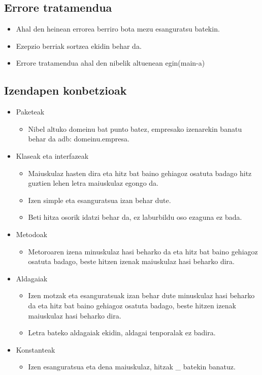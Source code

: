 \subsection{Errore tratamendua}
    \begin{itemize}
      \item Ahal den heinean errorea berriro bota mezu esanguratsu batekin.
      \item Ezepzio berriak sortzea ekidin behar da.
      \item Errore tratamendua ahal den nibelik altuenean egin(main-a)
    \end{itemize}
  
  
  

\subsection{Izendapen konbetzioak}
	\begin{itemize}
	  \item Paketeak
	    \begin{itemize}
	      \item Nibel altuko domeinu bat punto batez, empresako izenarekin banatu behar da adb: domeinu.empresa.       
	    \end{itemize}
	  \item  Klaseak eta interfazeak
	    \begin{itemize}
	      \item Maiuskulaz hasten dira eta hitz bat baino gehiagoz osatuta badago hitz guztien lehen letra maiuskulaz egongo da.
	      \item Izen simple eta esanguratsua izan behar dute.
	      \item Beti hitza osorik idatzi behar da, ez laburbildu oso ezaguna ez bada.
	    \end{itemize}
	  \item Metodoak
	    \begin{itemize}
	      \item Metoroaren izena minuskulaz hasi beharko da eta hitz bat baino gehiagoz osatuta badago, beste hitzen izenak maiuskulaz hasi beharko dira.
	    \end{itemize}
	  \item Aldagaiak
	    \begin{itemize}
	      \item Izen motzak eta esanguratsuak izan behar dute minuskulaz hasi beharko da eta hitz bat baino gehiagoz osatuta badago, beste hitzen izenak maiuskulaz hasi beharko dira.
	      \item Letra bateko aldagaiak ekidin, aldagai tenporalak ez badira.	      
	    \end{itemize}
	  \item Konstanteak
	    \begin{itemize}
	      \item Izen esanguratsua eta dena maiuskulaz, hitzak \_ batekin banatuz.        
	    \end{itemize}
	\end{itemize}
  


